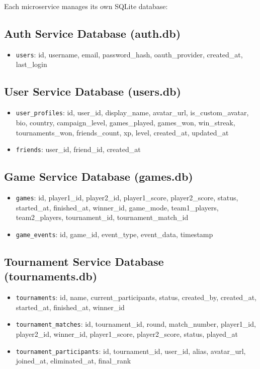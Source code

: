 \documentclass[11pt,a4paper]{report}
\begin{document}
Each microservice manages its own SQLite database:

\subsection{Auth Service Database (auth.db)}
\begin{itemize}
  \item \texttt{users}: id, username, email, password\_hash, oauth\_provider, created\_at, last\_login
\end{itemize}

\subsection{User Service Database (users.db)}
\begin{itemize}
  \item \texttt{user\_profiles}: id, user\_id, display\_name, avatar\_url, is\_custom\_avatar, bio, country, campaign\_level, games\_played, games\_won, win\_streak, tournaments\_won, friends\_count, xp, level, created\_at, updated\_at
  \item \texttt{friends}: user\_id, friend\_id, created\_at
\end{itemize}

\subsection{Game Service Database (games.db)}
\begin{itemize}
  \item \texttt{games}: id, player1\_id, player2\_id, player1\_score, player2\_score, status, started\_at, finished\_at, winner\_id, game\_mode, team1\_players, team2\_players, tournament\_id, tournament\_match\_id
  \item \texttt{game\_events}: id, game\_id, event\_type, event\_data, timestamp
\end{itemize}


\subsection{Tournament Service Database (tournaments.db)}
\begin{itemize}
  \item \texttt{tournaments}: id, name, current\_participants, status, created\_by, created\_at, started\_at, finished\_at, winner\_id
  \item \texttt{tournament\_matches}: id, tournament\_id, round, match\_number, player1\_id, player2\_id, winner\_id, player1\_score, player2\_score, status, played\_at
  \item \texttt{tournament\_participants}: id, tournament\_id, user\_id, alias, avatar\_url, joined\_at, eliminated\_at, final\_rank
\end{itemize}
\end{document}
